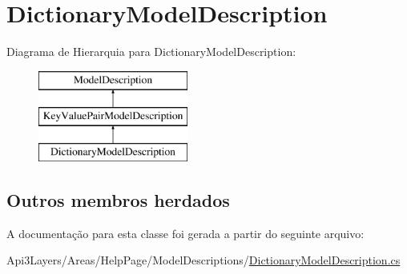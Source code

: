 \hypertarget{classApi3Layers_1_1Areas_1_1HelpPage_1_1ModelDescriptions_1_1DictionaryModelDescription}{}\section{Dictionary\+Model\+Description}
\label{classApi3Layers_1_1Areas_1_1HelpPage_1_1ModelDescriptions_1_1DictionaryModelDescription}
Diagrama de Hierarquia para Dictionary\+Model\+Description\+:\begin{figure}[H]
\begin{center}
\leavevmode
\includegraphics[height=3.000000cm]{classApi3Layers_1_1Areas_1_1HelpPage_1_1ModelDescriptions_1_1DictionaryModelDescription}
\end{center}
\end{figure}
\subsection*{Outros membros herdados}


A documentação para esta classe foi gerada a partir do seguinte arquivo\+:\begin{DoxyCompactItemize}
\item 
Api3\+Layers/\+Areas/\+Help\+Page/\+Model\+Descriptions/\hyperlink{DictionaryModelDescription_8cs}{Dictionary\+Model\+Description.\+cs}\end{DoxyCompactItemize}
